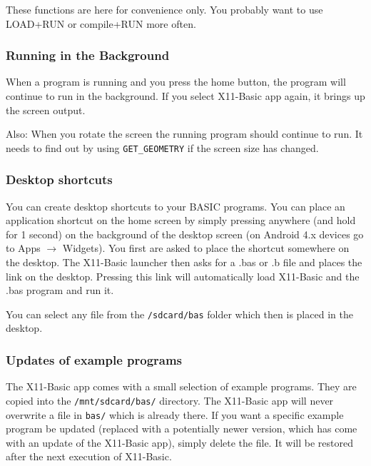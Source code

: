 These functions are here for convenience only. You probably want to use LOAD+RUN
or compile+RUN more often.

\subsubsection*{Running in the Background}

When a program is running and you press the home button, the program
will continue to run in the background. If you select X11-Basic app
again, it brings up the screen output.

Also: When you rotate the screen the running program should continue to run. It
needs to find out by using \verb|GET_GEOMETRY| if the screen size has changed. 

\subsubsection*{Desktop shortcuts}

You can create desktop shortcuts to your BASIC programs. You can place an
application shortcut on the home screen by simply pressing anywhere (and hold
for 1 second) on the background of the desktop screen (on Android 4.x devices go
to Apps $\rightarrow$ Widgets).  You first are asked to place the shortcut somewhere on the
desktop. The X11-Basic launcher then asks for a .bas or .b file and places the
link on the desktop. Pressing this link will automatically load X11-Basic and
the .bas program and run it.

You can select any file from the \verb|/sdcard/bas| folder which then is placed in the
desktop.

\subsubsection*{Updates of example programs}

The X11-Basic app comes with a small selection of example programs. They are 
copied into the \verb|/mnt/sdcard/bas/| directory. The X11-Basic app will never
overwrite a file in \verb|bas/| which is already there. If you want a specific
example program be updated (replaced with a potentially newer version, which has
come with an update of the X11-Basic app), simply delete the file. It will be
restored after the next execution of X11-Basic.


